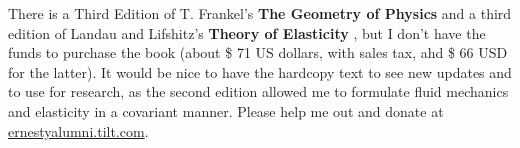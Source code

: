 \documentclass[twoside,landscape,10pt]{amsart}
\theoremstyle{plain}
\theoremstyle{definition}
\theoremstyle{remark}
\begin{document}
There is a Third Edition of T. Frankel's \textbf{The Geometry of Physics} \cite{TFrankel2004} and a third edition of Landau and Lifshitz's \textbf{Theory of Elasticity} \cite{LLandauELifshitz1970}, but I don't have the funds to purchase the book (about \$ 71 US dollars, with sales tax, ahd \$ 66 USD for the latter). It would be nice to have the hardcopy text to see new updates and to use for research, as the second edition allowed me to formulate fluid mechanics and elasticity in a covariant manner.  Please help me out and donate at \url{ernestyalumni.tilt.com}.  
\end{document}
